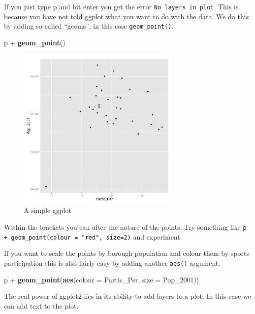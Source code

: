 \documentclass[]{article}
\newenvironment{Shaded}{}{}
\newcommand{\KeywordTok}[1]{\textcolor[rgb]{0.00,0.44,0.13}{\textbf{{#1}}}}
\newcommand{\DataTypeTok}[1]{\textcolor[rgb]{0.56,0.13,0.00}{{#1}}}
\newcommand{\NormalTok}[1]{{#1}}
\let\Oldincludegraphics\includegraphics
\renewcommand{\includegraphics}[1]{\Oldincludegraphics[width=8cm]{#1}}
\begin{document}
If you just type p and hit enter you get the error
\texttt{No layers in plot}. This is because you have not told ggplot
what you want to do with the data. We do this by adding so-called
``geoms'', in this case \texttt{geom\_point()}.

\begin{Shaded}
\begin{Highlighting}[]
\NormalTok{p + }\KeywordTok{geom_point}\NormalTok{()}
\end{Highlighting}
\end{Shaded}
\begin{figure}[htbp]
\centering
\includegraphics{figure/A_simple_ggplot.png}
\caption{A simple ggplot}
\end{figure}

Within the brackets you can alter the nature of the points. Try
something like \texttt{p + geom\_point(colour = "red", size=2)} and
experiment.

If you want to scale the points by borough population and colour them by
sports participation this is also fairly easy by adding another
\texttt{aes()} argument.

\begin{Shaded}
\begin{Highlighting}[]
\NormalTok{p + }\KeywordTok{geom_point}\NormalTok{(}\KeywordTok{aes}\NormalTok{(}\DataTypeTok{colour =} \NormalTok{Partic_Per, }\DataTypeTok{size =} \NormalTok{Pop_2001))}
\end{Highlighting}
\end{Shaded}
The real power of ggplot2 lies in its ability to add layers to a plot.
In this case we can add text to the plot.
\end{document}
